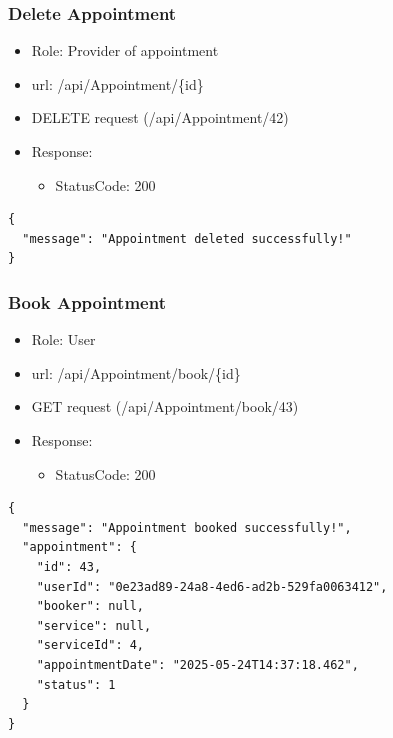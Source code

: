 \documentclass[11pt]{article}
\begin{document}
\subsubsection{Delete Appointment}
\label{sec:orgb0b2e28}
\begin{itemize}
\item Role: Provider of appointment
\item url: /api/Appointment/\{id\}
\item DELETE request (/api/Appointment/42)
\item Response:
\begin{itemize}
\item StatusCode: 200
\end{itemize}
\end{itemize}
\begin{verbatim}
{
  "message": "Appointment deleted successfully!"
}
\end{verbatim}
\subsubsection{Book Appointment}
\label{sec:org2a4fce2}
\begin{itemize}
\item Role: User
\item url: /api/Appointment/book/\{id\}
\item GET request (/api/Appointment/book/43)
\item Response:
\begin{itemize}
\item StatusCode: 200
\end{itemize}
\end{itemize}
\begin{verbatim}
{
  "message": "Appointment booked successfully!",
  "appointment": {
    "id": 43,
    "userId": "0e23ad89-24a8-4ed6-ad2b-529fa0063412",
    "booker": null,
    "service": null,
    "serviceId": 4,
    "appointmentDate": "2025-05-24T14:37:18.462",
    "status": 1
  }
}
\end{verbatim}
\end{document}
